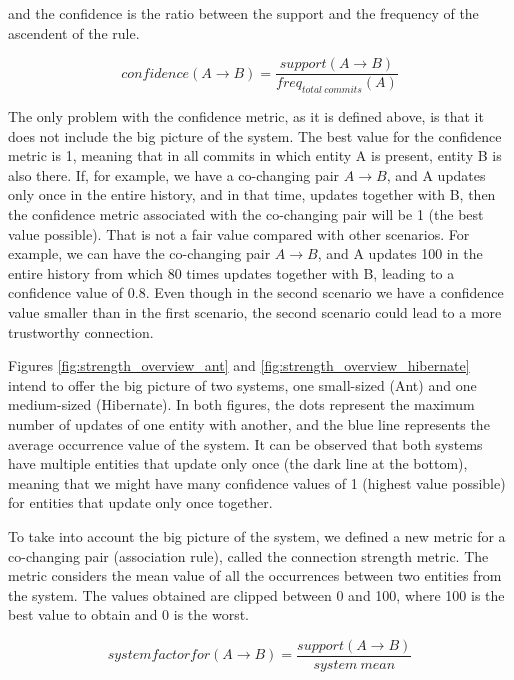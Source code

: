 \documentclass[runningheads]{comsis2}
\begin{document}
and the confidence is the ratio between the support and the frequency of the ascendent of the rule.

\begin{equation}
confidence (A \rightarrow B) =\frac{support (A \rightarrow B) }{freq_{total\ commits}(A)}
\end{equation}


The only problem with the confidence metric, as it is defined above, is that it does not include the big picture of the system.
The best value for the confidence metric is 1, meaning that in all commits in which entity A is present, entity B is also there. If, for example, we have a co-changing pair $A \rightarrow B$, and A updates only once in the entire history, and in that time, updates together with B, then the confidence metric associated with the co-changing pair will be 1 (the best value possible). That is not a fair value compared with other scenarios. For example, we can have the co-changing pair $A \rightarrow B$, and A updates 100 in the entire history from which 80 times updates together with B, leading to a confidence value of 0.8.
Even though in the second scenario we have a confidence value smaller than in the first scenario, the second scenario could lead to a more trustworthy connection.


Figures \ref{fig:strength_overview_ant} and \ref{fig:strength_overview_hibernate}  intend to offer the big picture of two systems, one small-sized (Ant) and one medium-sized (Hibernate). In both figures, the dots represent the maximum number of updates of one entity with another, and the blue line represents the average occurrence value of the system.
It can be observed that both systems have multiple entities that update only once (the dark line at the bottom), meaning that we might have many confidence values of 1 (highest value possible) for entities that update only once together.


To take into account the big picture of the system, we defined a new metric for a co-changing pair (association rule), called the connection strength metric. The metric considers the mean value of all the occurrences between two entities from the system. The values obtained are clipped between 0 and 100, where 100 is the best value to obtain and 0 is the worst.

\begin{equation}
 system factor for (A \rightarrow B) =\frac{support (A \rightarrow B) }{system\ mean}
\end{equation}
\end{document}
